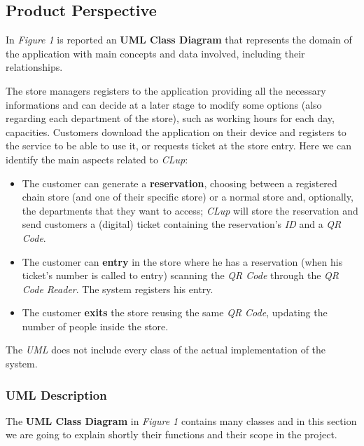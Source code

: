 \documentclass{article}
\begin{document}
	\subsection{Product Perspective}
	
	
	In \emph{Figure 1} is reported an {\bfseries UML Class Diagram} that represents the domain of the application with main concepts and data involved, including their relationships.
	
	The store managers registers to the application providing all the necessary informations and can decide at a later stage to modify some options (also regarding each department of the store), such as working hours for each day, capacities. Customers download the application on their device and registers to the service to be able to use it, or requests ticket at the store entry. Here we can identify the main aspects related to \emph{CLup}:
	
	\begin{itemize}
		
		\item The customer can generate a {\bfseries reservation}, choosing between a registered chain store (and one of their specific store) or a normal store and, optionally, the departments that they want to access; \emph{CLup} will store the reservation and send customers a (digital) ticket containing the reservation's \emph{ID} and a \emph{QR Code}.
		
		\item The customer can {\bfseries entry} in the store where he has a reservation (when his ticket's number is called to entry) scanning the \emph{QR Code} through the \emph{QR Code Reader}. The system registers his entry.
		
		\item The customer {\bfseries exits} the store reusing the same \emph{QR Code}, updating the number of people inside the store.
		
	\end{itemize}

	The \emph{UML} does not include every class of the actual implementation of the system.
		
		\subsubsection{UML Description}
		
			The {\bfseries UML Class Diagram} in \emph{Figure 1} contains many classes and in this section we are going to explain shortly their functions and their scope in the project.
			
\end{document}
